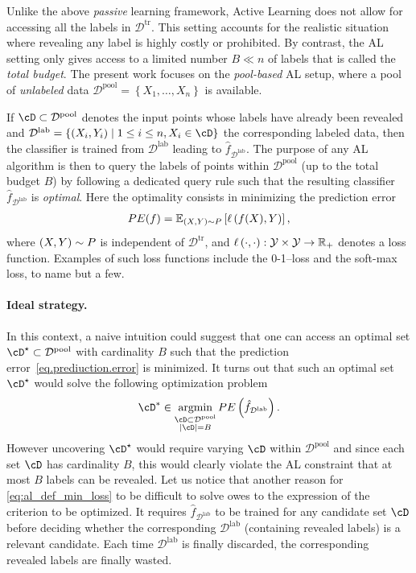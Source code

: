 \documentclass[twoside]{article}
\theoremstyle{definition}
\theoremstyle{remark}
\newcommand{\Dlab}{\mathcal{D}^{\mathrm{lab}}}
\newcommand{\Dpool}{\mathcal{D}^{\mathrm{pool}}}
\newcommand{\Dtrain}{\mathcal{D}^{\mathrm{tr}}}
\newcommand{\paren}[1]{\left( #1 \right)}
\newcommand{\acc}[1]{\left\{ #1 \right\}}
\begin{document}
Unlike the above \emph{passive} learning framework, Active Learning does not allow for accessing all the labels in $\Dtrain$.
This setting accounts for the realistic situation where revealing any label is highly costly or prohibited. 
%
By contrast, the AL setting only gives access to a limited number $B\ll n$ of labels that is called the \emph{total budget}. 
%
The present work focuses on the \emph{pool-based} AL setup, where a pool of \emph{unlabeled} data $\Dpool = \acc{X_1, \ldots, X_n}$ is available.


If $\cD\subset \Dpool$ 
denotes the input points whose labels have already been revealed and $\Dlab = \acc{(X_i,Y_i) \mid 1\leq i\leq n, X_i \in \cD}$ the corresponding labeled data, then the classifier is trained from $\Dlab$ leading to $\hat f_{\Dlab}$. 
%
The purpose of any AL algorithm is then to query the labels of points within $\Dpool$ (up to the total budget $B$) by following a dedicated query rule such that the resulting classifier $\hat f_{\Dlab}$ is \emph{optimal}. 
%
Here the optimality consists in minimizing the prediction error 
\begin{align}\label{eq.prediuction.error}
    PE( f ) = \mathbb{E}_{\left(X,Y\right)\sim P}\left[\ell\left( f(X), Y\right)\right],
\end{align}
where $\left(X,Y\right)\sim P$ is independent of $\Dtrain$, and $\ell\paren{\cdot,\cdot}: \mathcal{Y} \times \mathcal{Y} \to \R_+$ denotes a loss function. Examples of such loss functions include the 0-1--loss and the soft-max loss, to name but a few.
%

\paragraph{Ideal strategy.}
%
In this context, a naive intuition could suggest that one can access an optimal set $\cD^\star \subset \Dpool$ with cardinality $B$ such that the prediction error~\eqref{eq.prediuction.error} is minimized. It turns out that such an optimal set $\cD^\star$ would solve the following optimization problem
%
 \begin{equation}\label{eq:al_def_min_loss}
				\cD^* \in \argmin_{\substack{\cD \subset \Dpool\\ \abs{\cD} = B}} PE\paren{ \hat{f}_{\Dlab}}.
\end{equation}    
%
However uncovering $\cD^\star$ would require varying $\cD$ within $\Dpool$ and since each set $\cD$ has cardinality $B$, this would clearly violate the AL constraint that at most $B$ labels can be revealed.
%
Let us notice that another reason for \cref{eq:al_def_min_loss} to be difficult to solve owes to the expression of the criterion to be optimized. It requires $\hat{f}_{\Dlab}$ to be trained for any candidate set $\cD$ before deciding whether the corresponding $\Dlab$ (containing revealed labels) is a relevant candidate. Each time $\Dlab$ is finally discarded, the corresponding revealed labels are finally wasted.
\end{document}
